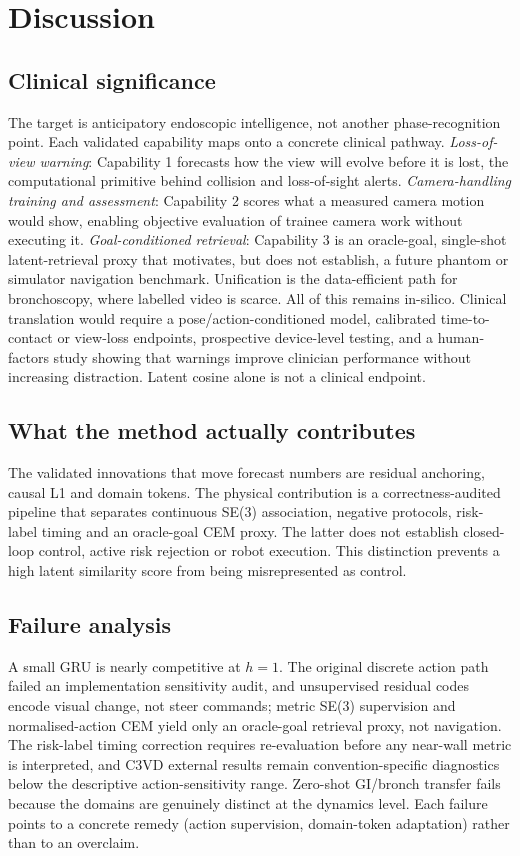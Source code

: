 \documentclass[preprint,12pt]{elsarticle}
\begin{document}
\section{Discussion}

\subsection{Clinical significance}
The target is anticipatory endoscopic intelligence, not another phase-recognition point.
Each validated capability maps onto a concrete clinical pathway.
\emph{Loss-of-view warning}: Capability 1 forecasts how the view will evolve
before it is lost, the computational primitive behind collision and
loss-of-sight alerts.
\emph{Camera-handling training and assessment}: Capability 2 scores what a
measured camera motion would show, enabling objective evaluation of trainee
camera work without executing it.
\emph{Goal-conditioned retrieval}: Capability 3 is an oracle-goal,
single-shot latent-retrieval proxy that motivates, but does not establish, a
future phantom or simulator navigation benchmark.
Unification is the data-efficient path for bronchoscopy, where labelled video is scarce.
All of this remains in-silico.
Clinical translation would require a pose/action-conditioned model, calibrated
time-to-contact or view-loss endpoints, prospective device-level testing, and
a human-factors study showing that warnings improve clinician performance
without increasing distraction. Latent cosine alone is not a clinical
endpoint.

\subsection{What the method actually contributes}
The validated innovations that move forecast numbers are residual anchoring,
causal L1 and domain tokens. The physical contribution is a
correctness-audited pipeline that separates continuous SE(3) association,
negative protocols, risk-label timing and an oracle-goal CEM proxy. The latter
does not establish closed-loop control, active risk rejection or robot
execution. This distinction prevents a high latent similarity score from being
misrepresented as control.

\subsection{Failure analysis}
A small GRU is nearly competitive at $h{=}1$.
The original discrete action path failed an implementation sensitivity audit,
and unsupervised residual codes encode visual change, not steer commands;
metric SE(3) supervision and normalised-action CEM yield only an oracle-goal
retrieval proxy, not navigation. The risk-label timing correction requires
re-evaluation before any near-wall metric is interpreted, and C3VD external
results remain convention-specific diagnostics below the descriptive
action-sensitivity range.
Zero-shot GI/bronch transfer fails because the domains are genuinely distinct at the dynamics level.
Each failure points to a concrete remedy (action supervision, domain-token adaptation) rather than to an overclaim.
\end{document}
